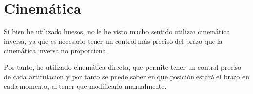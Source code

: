 \section{Cinemática}

Si bien he utilizado huesos, no le he visto mucho sentido utilizar cinemática inversa, ya que es necesario tener un control más preciso del brazo que la cinemática inversa no proporciona.

\bigskip

Por tanto, he utilizado cinemática directa, que permite tener un control preciso de cada articulación y por tanto se puede saber en qué posición estará el brazo en cada momento, al tener que modificarlo manualmente.